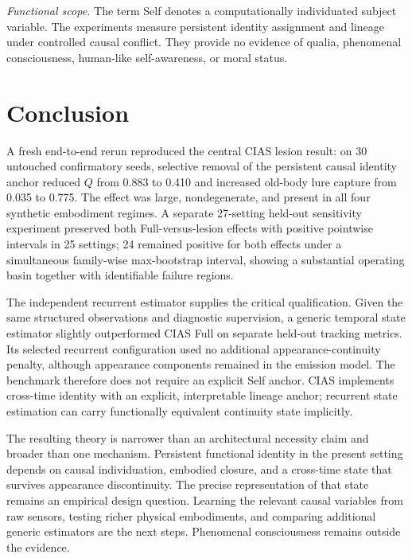 \documentclass[journal]{IEEEtran}
\begin{document}
\noindent\emph{Functional scope.} The term Self denotes a computationally individuated subject variable. The experiments measure persistent identity assignment and lineage under controlled causal conflict. They provide no evidence of qualia, phenomenal consciousness, human-like self-awareness, or moral status.

\section{Conclusion}
A fresh end-to-end rerun reproduced the central CIAS lesion result: on 30 untouched confirmatory seeds, selective removal of the persistent causal identity anchor reduced $Q$ from 0.883 to 0.410 and increased old-body lure capture from 0.035 to 0.775. The effect was large, nondegenerate, and present in all four synthetic embodiment regimes. A separate 27-setting held-out sensitivity experiment preserved both Full-versus-lesion effects with positive pointwise intervals in 25 settings; 24 remained positive for both effects under a simultaneous family-wise max-bootstrap interval, showing a substantial operating basin together with identifiable failure regions.

The independent recurrent estimator supplies the critical qualification. Given the same structured observations and diagnostic supervision, a generic temporal state estimator slightly outperformed CIAS Full on separate held-out tracking metrics. Its selected recurrent configuration used no additional appearance-continuity penalty, although appearance components remained in the emission model. The benchmark therefore does not require an explicit Self anchor. CIAS implements cross-time identity with an explicit, interpretable lineage anchor; recurrent state estimation can carry functionally equivalent continuity state implicitly.

The resulting theory is narrower than an architectural necessity claim and broader than one mechanism. Persistent functional identity in the present setting depends on causal individuation, embodied closure, and a cross-time state that survives appearance discontinuity. The precise representation of that state remains an empirical design question. Learning the relevant causal variables from raw sensors, testing richer physical embodiments, and comparing additional generic estimators are the next steps. Phenomenal consciousness remains outside the evidence.
\end{document}

